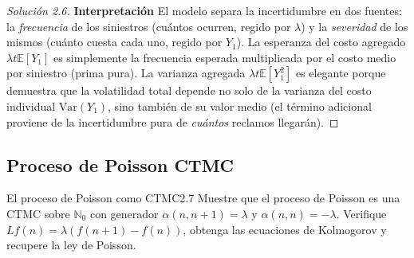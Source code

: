 \documentclass[10pt,a4paper]{article}
\begin{document}
\begin{proof}[Solución 2.6]
    \textbf{Interpretación}
    El modelo separa la incertidumbre en dos fuentes: la \textit{frecuencia} de los siniestros (cuántos ocurren, regido por $\lambda$) y la \textit{severidad} de los mismos (cuánto cuesta cada uno, regido por $Y_1$). 
    La esperanza del costo agregado $\lambda t \mathbb{E}[Y_1]$ es simplemente la frecuencia esperada multiplicada por el costo medio por siniestro (prima pura).
    La varianza agregada $\lambda t \mathbb{E}[Y_1^2]$ es elegante porque demuestra que la volatilidad total depende no solo de la varianza del costo individual $\text{Var}(Y_1)$, sino también de su valor medio (el término adicional proviene de la incertidumbre pura de \textit{cuántos} reclamos llegarán).
\end{proof}

\newpage
\subsection{Proceso de Poisson CTMC}

\begin{ejercicio}{El proceso de Poisson como CTMC}{2.7}
    Muestre que el proceso de Poisson es una CTMC sobre $\mathbb{N}_0$ con generador $\alpha(n,n+1) = \lambda$ y $\alpha(n,n) = -\lambda$. Verifique $Lf(n) = \lambda(f(n+1)-f(n))$, obtenga las ecuaciones de Kolmogorov y recupere la ley de Poisson.
\end{ejercicio}
\end{document}
